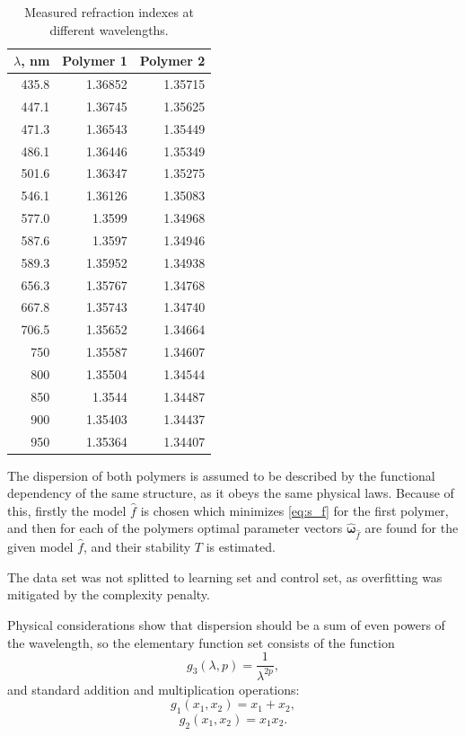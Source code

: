 \documentclass[11pt,a4paper]{article}
\theoremstyle{definition}
\begin{document}
\begin{table}[h]
  \footnotesize
  \caption{Measured refraction indexes at different wavelengths.}
  \centering
  \begin{tabular}{r | r | r}
	$\lambda$, nm	& Polymer 1 & Polymer 2 \\ \hline
	435.8 & 1.36852 & 1.35715 \\
	447.1 & 1.36745 & 1.35625 \\
	471.3 & 1.36543 & 1.35449 \\
	486.1 & 1.36446 & 1.35349 \\
	501.6 & 1.36347 & 1.35275 \\
	546.1 & 1.36126 & 1.35083 \\
	577.0 & 1.3599 & 1.34968 \\
	587.6 & 1.3597 & 1.34946 \\
	589.3 & 1.35952 & 1.34938 \\
	656.3 & 1.35767 & 1.34768 \\
	667.8 & 1.35743 & 1.34740 \\
	706.5 & 1.35652 & 1.34664 \\
	750 & 1.35587 & 1.34607 \\
	800 & 1.35504 & 1.34544 \\
	850 & 1.3544 & 1.34487 \\
	900 & 1.35403 & 1.34437 \\
	950 & 1.35364 & 1.34407 \\
  \end{tabular}
  \label{tabl:source_data}
\end{table}

The dispersion of both polymers is assumed to be described by the functional dependency
of the same structure, as it obeys the same physical laws. Because of this, firstly the
model $\hat{f}$ is chosen which minimizes \eqref{eq:s_f} for the first polymer, and then
for each of the polymers optimal parameter vectors $\hat{\boldsymbol{\omega}}_{\hat{f}}$
are found for the given model $\hat{f}$, and their stability $T$ is estimated.

The data set was not splitted to learning set and control set, as overfitting was
mitigated by the complexity penalty.

Physical considerations show \citep{Serova11_en} that dispersion should be a sum of even
powers of the wavelength, so the elementary function set consists of the function
\[
  g_3(\lambda, p) = \frac{1}{\lambda^{2p}},
\]
and standard addition and multiplication operations:
\[
  g_1(x_1, x_2) = x_1 + x_2,
\]
\[
  g_2(x_1, x_2) = x_1 x_2.
\]
\end{document}
